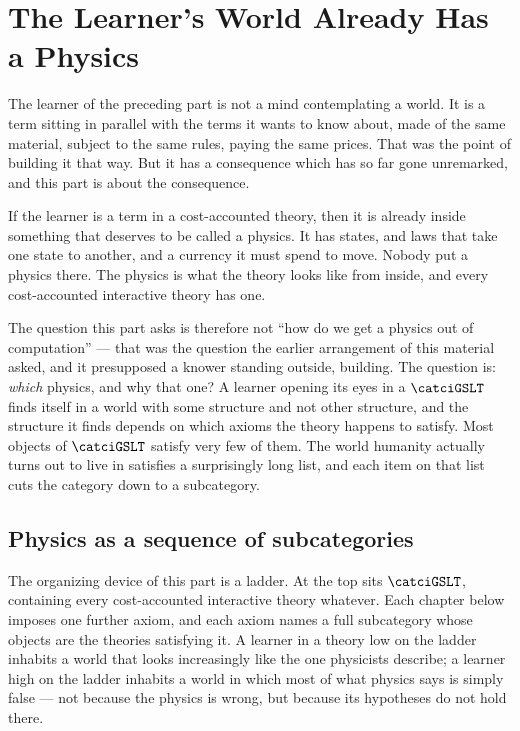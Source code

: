 \chapter{The Learner's World Already Has a Physics}
\label{sec:causality-intro}

The learner of the preceding part is not a mind contemplating a world.
It is a term sitting in parallel with the terms it wants to know about,
made of the same material, subject to the same rules, paying the same
prices.
That was the point of building it that way.
But it has a consequence which has so far gone unremarked, and this part
is about the consequence.

If the learner is a term in a cost-accounted theory, then it is already
inside something that deserves to be called a physics.
It has states, and laws that take one state to another, and a currency it
must spend to move.
Nobody put a physics there.
The physics is what the theory looks like from inside, and every
cost-accounted interactive theory has one.

The question this part asks is therefore not ``how do we get a physics
out of computation'' --- that was the question the earlier arrangement of
this material asked, and it presupposed a knower standing outside,
building.
The question is: \emph{which} physics, and why that one?
A learner opening its eyes in a $\catciGSLT$ finds itself in a world with
some structure and not other structure, and the structure it finds
depends on which axioms the theory happens to satisfy.
Most objects of $\catciGSLT$ satisfy very few of them.
The world humanity actually turns out to live in satisfies a
surprisingly long list, and each item on that list cuts the category
down to a subcategory.

\section{Physics as a sequence of subcategories}
\label{sec:physics-ladder}

The organizing device of this part is a ladder.
At the top sits $\catciGSLT$, containing every cost-accounted interactive
theory whatever.
Each chapter below imposes one further axiom, and each axiom names a full
subcategory whose objects are the theories satisfying it.
A learner in a theory low on the ladder inhabits a world that looks
increasingly like the one physicists describe; a learner high on the
ladder inhabits a world in which most of what physics says is simply
false --- not because the physics is wrong, but because its hypotheses do
not hold there.

